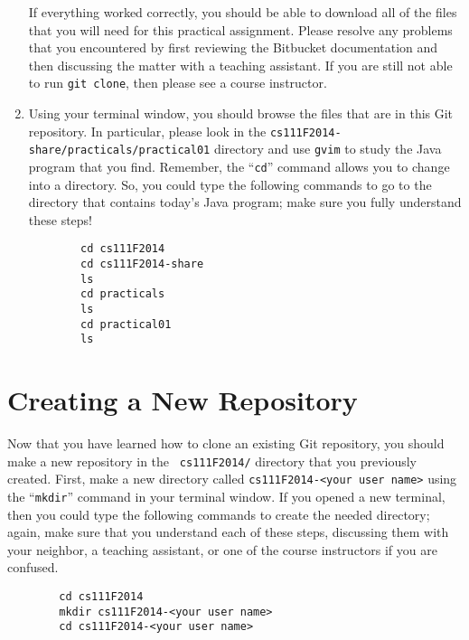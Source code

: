 \begin{enumerate}
    If everything worked correctly, you should be able to download all of the files that you will need for this
    practical assignment. Please resolve any problems that you encountered by first reviewing the Bitbucket
    documentation and then discussing the matter with a teaching assistant.  If you are still not able to run {\tt git
      clone}, then please see a course instructor.

  \item Using your terminal window, you should browse the files that are in this Git repository.  In particular, please
    look in the {\tt cs111F2014-share/practicals/practical01} directory and use {\tt gvim} to study the Java program that
    you find.  Remember, the ``{\tt cd}'' command allows you to change into a directory. So, you could type the following
    commands to go to the directory that contains today's Java program; make sure you fully understand these steps!

    \vspace*{-.1in}
    \begin{verbatim}
        cd cs111F2014
        cd cs111F2014-share
        ls
        cd practicals
        ls
        cd practical01
        ls
    \end{verbatim}
    \vspace*{-.5in}

    \end{enumerate}

\section*{Creating a New Repository}

Now that you have learned how to clone an existing Git repository, you should make a new repository in the {\tt
  cs111F2014/} directory that you previously created.  First, make a new directory called {\tt cs111F2014-<your user
  name>} using the ``{\tt mkdir}'' command in your terminal window. If you opened a new terminal, then you could type
the following commands to create the needed directory; again, make sure that you understand each of these steps,
discussing them with your neighbor, a teaching assistant, or one of the course instructors if you are confused.

    \vspace*{-.1in}
    \begin{verbatim}
        cd cs111F2014
        mkdir cs111F2014-<your user name>
        cd cs111F2014-<your user name>
    \end{verbatim}
    \vspace*{-.1in}

